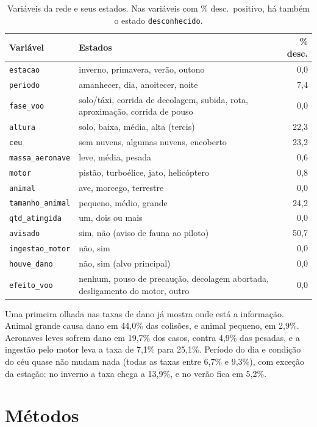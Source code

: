 \documentclass[10pt,a4paper,twocolumn]{article}
\newcommand{\var}[1]{\texttt{#1}}
\begin{document}
\begin{table}[t]
\centering\small
\caption{Variáveis da rede e seus estados. Nas variáveis com \% desc.\ positivo, há também o estado
\var{desconhecido}.}
\label{tab:variaveis}
\setlength{\tabcolsep}{3pt}
\begin{tabular}{@{}lp{4.55cm}r@{}}
\toprule
Variável & Estados & \% desc. \\
\midrule
\var{estacao} & inverno, primavera, verão, outono & 0,0 \\
\var{periodo} & amanhecer, dia, anoitecer, noite & 7,4 \\
\var{fase\_voo} & solo/táxi, corrida de decolagem, subida, rota, aproximação, corrida de pouso & 0,0 \\
\var{altura} & solo, baixa, média, alta (tercis) & 22,3 \\
\var{ceu} & sem nuvens, algumas nuvens, encoberto & 23,2 \\
\var{massa\_aeronave} & leve, média, pesada & 0,6 \\
\var{motor} & pistão, turboélice, jato, helicóptero & 0,8 \\
\var{animal} & ave, morcego, terrestre & 0,0 \\
\var{tamanho\_animal} & pequeno, médio, grande & 24,2 \\
\var{qtd\_atingida} & um, dois ou mais & 0,0 \\
\var{avisado} & sim, não (aviso de fauna ao piloto) & 50,7 \\
\var{ingestao\_motor} & não, sim & 0,0 \\
\var{houve\_dano} & não, sim (alvo principal) & 0,0 \\
\var{efeito\_voo} & nenhum, pouso de precaução, decolagem abortada, desligamento do motor, outro & 0,0 \\
\bottomrule
\end{tabular}
\end{table}

Uma primeira olhada nas taxas de dano já mostra onde está a informação. Animal grande causa dano em 44,0\% das
colisões, e animal pequeno, em 2,9\%. Aeronaves leves sofrem dano em 19,7\% dos casos, contra 4,9\% das pesadas, e a
ingestão pelo motor leva a taxa de 7,1\% para 25,1\%. Período do dia e condição do céu quase não mudam nada (todas as
taxas entre 6,7\% e 9,3\%), com exceção da estação: no inverno a taxa chega a 13,9\%, e no verão fica em 5,2\%.

\section{Métodos}
\end{document}
